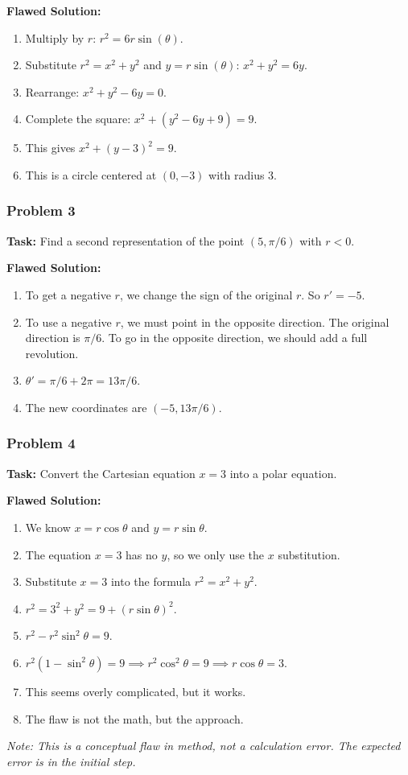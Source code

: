 \documentclass{article}
\begin{document}
\textbf{Flawed Solution:}
\begin{enumerate}
    \item Multiply by \(r\): \(r^2 = 6r\sin(\theta)\).
    \item Substitute \(r^2 = x^2+y^2\) and \(y = r\sin(\theta)\): \(x^2+y^2 = 6y\).
    \item Rearrange: \(x^2 + y^2 - 6y = 0\).
    \item Complete the square: \(x^2 + (y^2 - 6y + 9) = 9\).
    \item This gives \(x^2 + (y-3)^2 = 9\).
    \item This is a circle centered at \((0, -3)\) with radius 3.
\end{enumerate}

\subsubsection*{Problem 3}
\textbf{Task:} Find a second representation of the point \((5, \pi/6)\) with \(r < 0\).

\textbf{Flawed Solution:}
\begin{enumerate}
    \item To get a negative \(r\), we change the sign of the original \(r\). So \(r' = -5\).
    \item To use a negative \(r\), we must point in the opposite direction. The original direction is \(\pi/6\). To go in the opposite direction, we should add a full revolution.
    \item \(\theta' = \pi/6 + 2\pi = 13\pi/6\).
    \item The new coordinates are \((-5, 13\pi/6)\).
\end{enumerate}

\subsubsection*{Problem 4}
\textbf{Task:} Convert the Cartesian equation \(x=3\) into a polar equation.

\textbf{Flawed Solution:}
\begin{enumerate}
    \item We know \(x=r\cos\theta\) and \(y=r\sin\theta\).
    \item The equation \(x=3\) has no \(y\), so we only use the \(x\) substitution.
    \item Substitute \(x=3\) into the formula \(r^2 = x^2+y^2\).
    \item \(r^2 = 3^2 + y^2 = 9 + (r\sin\theta)^2\).
    \item \(r^2 - r^2\sin^2\theta = 9\).
    \item \(r^2(1-\sin^2\theta) = 9 \implies r^2\cos^2\theta = 9 \implies r\cos\theta = 3\).
    \item This seems overly complicated, but it works.
    \item The flaw is not the math, but the approach.
\end{enumerate}
\textit{Note: This is a conceptual flaw in method, not a calculation error. The expected error is in the initial step.}
\end{document}
